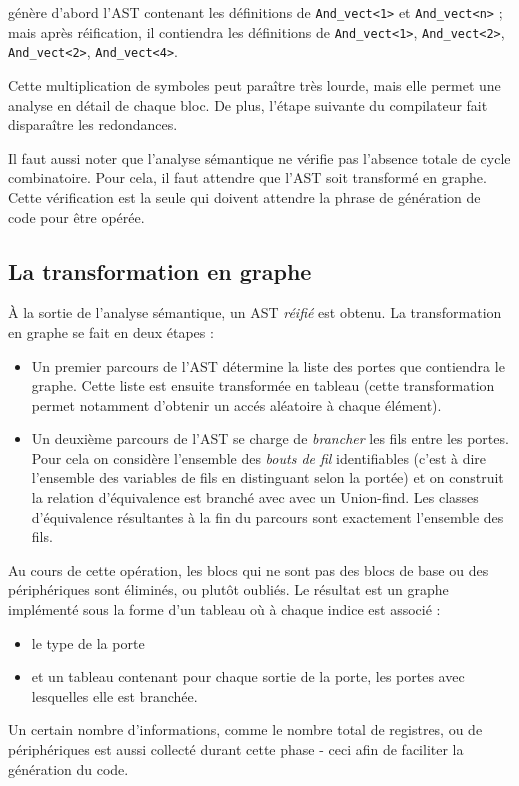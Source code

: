 \documentclass[13pt]{article}
\begin{document}
génère d'abord l'AST contenant les définitions de \texttt{And\_vect<1>} et
\texttt{And\_vect<n>} ; mais après réification, il contiendra les définitions de
\texttt{And\_vect<1>}, \texttt{And\_vect<2>}, \texttt{And\_vect<2>},
\texttt{And\_vect<4>}. 

Cette multiplication de symboles peut paraître très lourde, mais elle permet une
analyse en détail de chaque bloc. De plus, l'étape suivante du compilateur fait
disparaître les redondances.

Il faut aussi noter que l'analyse sémantique ne vérifie pas l'absence totale de
cycle combinatoire. Pour cela, il faut attendre que l'AST soit transformé en
graphe. Cette vérification est la seule qui doivent attendre la phrase de
génération de code pour être opérée.

\subsection{La transformation en graphe}

À la sortie de l'analyse sémantique, un AST \emph{réifié} est obtenu. La
transformation en graphe se fait en deux étapes :
\begin{itemize}
\item Un premier parcours de l'AST détermine la liste des portes
  que contiendra le graphe. Cette liste est ensuite transformée en tableau
  (cette transformation permet notamment d'obtenir un accés aléatoire à chaque
  élément).
\item Un deuxième parcours de l'AST se charge de \emph{brancher} les fils entre
  les portes. Pour cela on considère l'ensemble des \emph{bouts de fil} identifiables
  (c'est à dire l'ensemble des variables de fils en distinguant selon la portée)
  et on construit la relation d'équivalence \og est branché avec\fg{} avec un
  Union-find. Les classes d'équivalence résultantes à la fin du parcours sont
  exactement l'ensemble des fils.
\end{itemize}

Au cours de cette opération, les blocs qui ne sont pas des blocs de base ou des
périphériques sont éliminés, ou plutôt oubliés.
Le résultat est un graphe implémenté sous la forme d'un tableau où à chaque indice est
associé :
\begin{itemize}
\item le type de la porte 
\item et un tableau contenant pour chaque sortie de la porte, les portes avec lesquelles 
      elle est branchée. 
\end{itemize}
Un certain nombre d'informations, comme le nombre total de registres, ou de
périphériques est aussi collecté durant cette phase - ceci afin de faciliter la
génération du code. 
\end{document}
